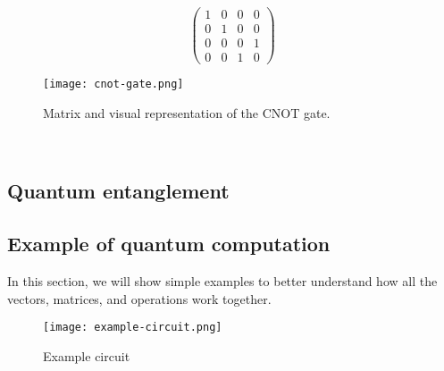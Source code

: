 \begin{figure}[H]
  \centering
  \begin{minipage}{0.4\linewidth}
    \centering
    $$\begin{pmatrix}
      1 & 0 & 0 & 0 \\
      0 & 1 & 0 & 0 \\
      0 & 0 & 0 & 1 \\
      0 & 0 & 1 & 0
  \end{pmatrix}$$
    \vfill
  \end{minipage}
  \begin{minipage}{0.25\linewidth}
    \centering
    \texttt{[image: cnot-gate.png]}
    \vfill
  \end{minipage}
  \caption{Matrix and visual representation of the CNOT gate.}
\end{figure}

\\
\subsection{Quantum entanglement}
\subsection{Example of quantum computation}
In this section, we will show simple examples to better understand how all the vectors, matrices, and operations work together.

\begin{figure}[H]
    \begin{center}
       \texttt{[image: example-circuit.png]}
       \caption{Example circuit}
    \end{center}
\end{figure}

